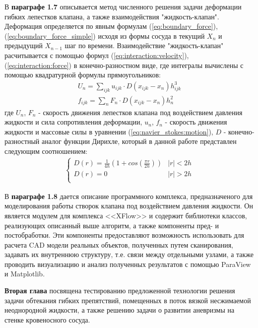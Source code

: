 В \textbf{параграфе 1.7} описывается метод численного решения задачи деформации гибких лепестков клапана,
а также взаимодействия "жидкость-клапан".
Деформация определяется по явным формулам (\ref{eq:boundary_force}),(\ref{eq:boundary_force_simple}) исходя из формы сосуда в текущий $X_{n}$ и предыдущий $X_{n-1}$ шаг по времени.
Взаимодействие "жидкость-клапан" расчитывается с помощью формул (\ref{eq:interaction:velocity}), (\ref{eq:interaction:force}) в конечно-разностном виде,
где интегралы вычислены с помощью квадратурной формулы прямоугольников:
\begin{gather}
    \label{eq:numerical_interpolation}
    U_n = \sum_{ijk}u_{ijk} \cdot D(x_{ijk} - x_n) h_{ijk}^3 \\
    \label{eq:numerical_spreading}
    f_{ijk} = \sum_n F_n \cdot D(x_{ijk} - x_n) h^2_n
\end{gather}
где $U_n$, $F_n$ - скорость движения лепестков клапана под воздействием давления жидкости и сила сопротивления деформации,
$u_n$, $f_n$ - скорость движения жидкости и массовые силы в уравнении (\ref{eq:navier_stokes:motion}),
$D$ - конечно-разностный аналог функции Дирихле, который в данной работе представлен следующим соотношением:
\begin{gather}
    \label{eq:numerical_dirichlet}
    \begin{cases}
        D(r) = \frac{1}{4h} (1 + cos(\frac{\pi r}{2h})) & |r| < 2h\\
        D(r) = 0 & |r| > 2h\\
    \end{cases}
\end{gather}


В \textbf{параграфе 1.8} дается описание программного комплекса,
предназначеного для моделирования работы створок клапана
под воздействием давления жидкости. Он является модулем для комплекса
<<XFlow>> и содержит библиотеки классов, реализующих описанный выше алгоритм,
а также компоненты пред- и постобработки. Эти компоненты предоставляют
возможность использовать для расчета CAD модели реальных объектов,
полученных путем сканирования, задавать их внутреннюю структуру, т.е.
связи между отдельными узлами, а также проводить визуализацию и анализ
полученных результатов с помощью ParaView и Matplotlib.

\textbf{Вторая глава} посвящена тестированию предложенной технологии решения задачи обтекания гибких препятствий,
помещенных в поток вязкой несжимаемой неоднородной жидкости, а также решению задачи о развитии аневризмы
на стенке кровеносного сосуда.

